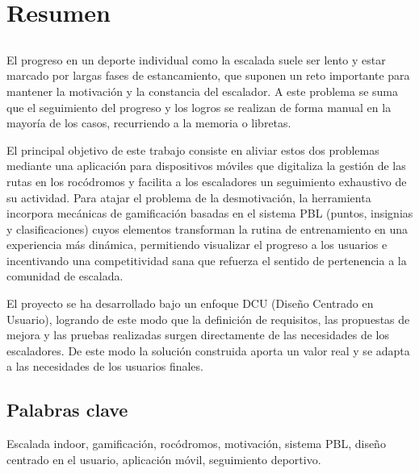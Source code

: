 \chapter*{Resumen}

\section*{\tituloPortadaVal}

El progreso en un deporte individual como la escalada suele ser lento y estar marcado por largas fases de estancamiento, que suponen un reto importante para mantener la motivación y la constancia del escalador. A este problema se suma que el seguimiento del progreso y los logros se realizan de forma manual en la mayoría de los casos, recurriendo a la memoria o libretas. 

El principal objetivo de este trabajo consiste en aliviar estos dos problemas mediante una aplicación para dispositivos móviles que digitaliza la gestión de las rutas en los rocódromos y facilita a los escaladores un seguimiento exhaustivo de su actividad. Para atajar el problema de la desmotivación, la herramienta incorpora mecánicas de gamificación basadas en el sistema PBL (puntos, insignias y clasificaciones) cuyos elementos transforman la rutina de entrenamiento en una experiencia más dinámica, permitiendo visualizar el progreso a los usuarios e incentivando una competitividad sana que refuerza el sentido de pertenencia a la comunidad de escalada. 

El proyecto se ha desarrollado bajo un enfoque DCU (Diseño Centrado en Usuario), logrando de este modo que la definición de requisitos, las propuestas de mejora y las pruebas realizadas surgen directamente de las necesidades de los escaladores. De este modo la solución construida aporta un valor real y se adapta a las necesidades de los usuarios finales.

\section*{Palabras clave}
   
\noindent Escalada indoor, gamificación, rocódromos, motivación, sistema PBL, diseño centrado en el usuario, aplicación móvil, seguimiento deportivo.